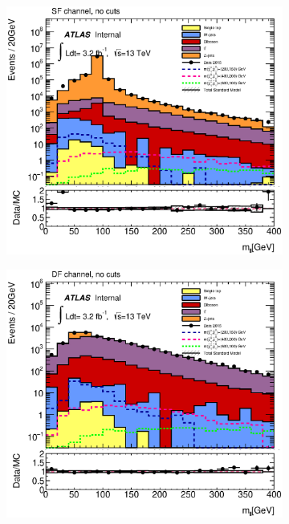 \begin{figure}[!th]	   
	\begin{subfigure}[t]{0.5\textwidth}
		\subcaption{} 
		\label{fig:SF_total_mll}
        \includegraphics[scale=0.42]{Chap4/SF_DileptonMll_13TeV_total_signal} 
        \end{subfigure} 
     \begin{subfigure}[t]{0.5\textwidth}
     \subcaption{}
     	\label{fig:DF_total_mll}
        \includegraphics[scale=0.42]{Chap4/Emu_DileptonMll_13TeV_total_signal} 

\end{subfigure}
\end{figure}
